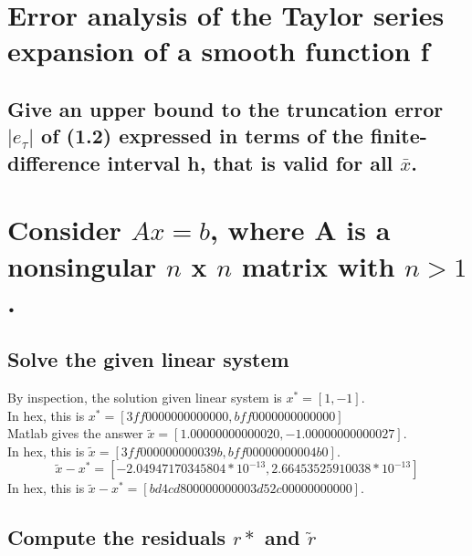 \documentclass[11pt]{modart}
\begin{document}
\section{Error analysis of the Taylor series expansion of a smooth function f}
\subsection{Give an upper bound to the truncation error $|e_\tau|$ of (1.2) expressed in terms of the finite-difference interval h, that is valid for all $\bar{x}$.}

\section{Consider $Ax=b$, where A is a nonsingular $n$ x $n$ matrix with $n>1$.}
\subsection{Solve the given linear system}
By inspection, the solution given linear system is $x^*=[1, -1]$.\\
In hex, this is $x^*=[3ff0000000000000, bff0000000000000]$\\
Matlab gives the answer $\tilde{x}=[1.00000000000020, -1.00000000000027]$.\\
In hex, this is $\tilde{x} = [3ff000000000039b, bff00000000004b0]$.\\
$$\tilde{x}-x^*= [-2.04947170345804 * 10^{-13}, 2.66453525910038 * 10^{-13}]$$
In hex, this is $\tilde{x}-x^* = [bd4cd80000000000 3d52c00000000000]$.\\
\subsection{Compute the residuals $r*$ and $\tilde{r}$}
\end{document}
